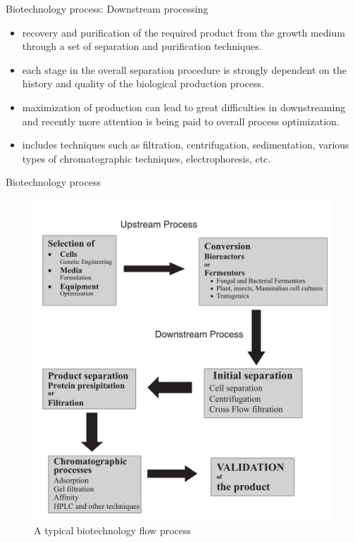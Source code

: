 \documentclass[ignorenonframetext,aspectratio=169]{beamer}
\providecommand{\tightlist}{%
  \setlength{\itemsep}{0pt}\setlength{\parskip}{0pt}}
\begin{document}
\begin{frame}{Biotechnology process: Downstream processing}
\protect\hypertarget{biotechnology-process-downstream-processing}{}

\begin{itemize}
\tightlist
\item
  recovery and purification of the required product from the growth
  medium through a set of separation and purification techniques.
\item
  each stage in the overall separation procedure is strongly dependent
  on the history and quality of the biological production process.
\item
  maximization of production can lead to great difficulties in
  downstreaming and recently more attention is being paid to overall
  process optimization.
\item
  includes techniques such as filtration, centrifugation, sedimentation,
  various types of chromatographic techniques, electrophoresis, etc.
\end{itemize}

\end{frame}

\begin{frame}{Biotechnology process}
\protect\hypertarget{biotechnology-process-1}{}

\begin{figure}
\includegraphics[width=0.4\linewidth]{../images/bioprocess_flow_chart} \caption{A typical biotechnology flow process}\label{fig:biotechnology-process}
\end{figure}

\end{frame}
\end{document}
